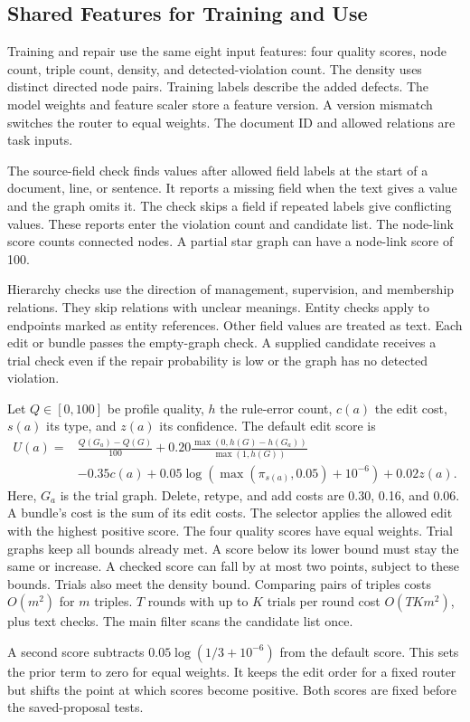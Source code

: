 \subsection{Shared Features for Training and Use}
\label{sec:impl:profile_revision}

Training and repair use the same eight input features: four quality scores,
node count, triple count, density, and detected-violation count.
The density uses distinct directed node pairs. Training labels describe
the added defects. The model weights and feature scaler store a feature
version. A version mismatch switches the router to equal weights.
The document ID and allowed relations are task inputs.

The source-field check finds values after allowed field labels at the
start of a document, line, or sentence. It reports a missing field when
the text gives a value and the graph omits it. The check skips a field if
repeated labels give conflicting values. These reports enter the violation
count and candidate list. The node-link score counts connected nodes.
A partial star graph can have a node-link score of 100.

Hierarchy checks use the direction of management, supervision, and membership
relations. They skip relations with unclear meanings. Entity checks apply
to endpoints marked as entity references. Other field values are treated
as text. Each edit or bundle passes the empty-graph check.
A supplied candidate receives a trial check even if the repair probability
is low or the graph has no detected violation.

Let $Q\in[0,100]$ be profile quality, $h$ the rule-error count, $c(a)$
the edit cost, $s(a)$ its type, and $z(a)$ its confidence.
The default edit score is
\begin{equation}
\begin{split}
U(a)={}&\frac{Q(G_a)-Q(G)}{100}
+0.20\frac{\max(0,h(G)-h(G_a))}{\max(1,h(G))}\\
&-0.35c(a)+0.05\log\!\left(\max(\pi_{s(a)},0.05)+10^{-6}\right)
+0.02z(a).
\end{split}
\end{equation}
Here, $G_a$ is the trial graph. Delete, retype, and add costs are 0.30,
0.16, and 0.06. A bundle's cost is the sum of its edit costs.
The selector applies the allowed edit with the highest positive score.
The four quality scores have equal weights.
Trial graphs keep all bounds already met. A score below its lower bound
must stay the same or increase. A checked score can fall by at most two
points, subject to these bounds. Trials also meet the density bound.
Comparing pairs of triples costs $O(m^2)$ for $m$ triples.
$T$ rounds with up to $K$ trials per round cost $O(TKm^2)$, plus text checks.
The main filter scans the candidate list once.

A second score subtracts $0.05\log(1/3+10^{-6})$ from the default score.
This sets the prior term to zero for equal weights. It keeps the edit order
for a fixed router but shifts the point at which scores become positive.
Both scores are fixed before the saved-proposal tests.

